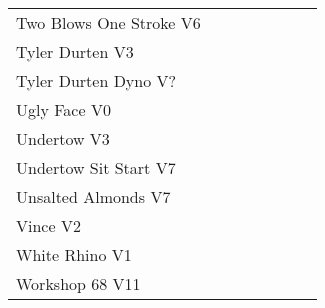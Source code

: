 \begin{flushleft}
\begin{center}
\begin{supertabular}{p{0.65\linewidth}r}
Two Blows One Stroke V6 & \pageref{rt:Two Blows One Stroke} \\
Tyler Durten V3 & \pageref{rt:Tyler Durten} \\
Tyler Durten Dyno V? & \pageref{vr:Tyler Durten Dyno} \\
Ugly Face V0 & \pageref{rt:Ugly Face} \\
Undertow V3 & \pageref{rt:Undertow} \\
Undertow Sit Start V7 & \pageref{vr:Undertow Sit Start} \\
Unsalted Almonds V7 & \pageref{rt:Unsalted Almonds} \\
Vince V2 & \pageref{rt:Vince} \\
White Rhino V1 & \pageref{rt:White Rhino} \\
Workshop 68 V11 & \pageref{rt:Workshop 68} \\
\end{supertabular}
\end{center}

\end{flushleft}
